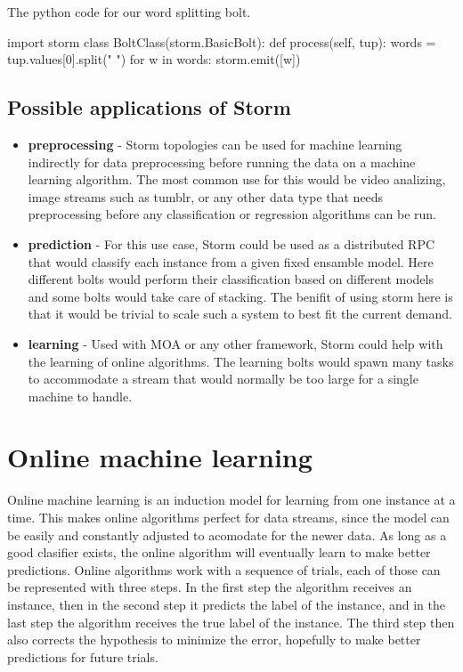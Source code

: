 \documentclass[journal]{IEEEtran/IEEEtran}
\begin{document}
The python code for our word splitting bolt.

\begin{code}

import storm
class BoltClass(storm.BasicBolt):
    def process(self, tup):
        words = tup.values[0].split(" ")
        for w in words:
            storm.emit([w])

\end{code}


\subsection{Possible applications of Storm}


\begin{itemize}
    \item \textbf{preprocessing} - Storm topologies can be used for machine learning indirectly for data preprocessing before running the data on a machine learning algorithm. The most common use for this would be video analizing, image streams such as tumblr, or any other data type that needs preprocessing before any classification or regression algorithms can be run.\\

    \item \textbf{prediction} - For this use case, Storm could be used as a distributed RPC that would classify each instance from a given fixed ensamble model. Here different bolts would perform their classification based on different models and some bolts would take care of stacking. The benifit of using storm here is that it would be trivial to scale such a system to best fit the current demand. 
\\
    \item \textbf{learning} - Used with MOA or any other framework, Storm could help with the learning of online algorithms. The learning bolts would spawn many tasks to accommodate a stream that would normally be too large for a single machine to handle.\\
\end{itemize}


\section{Online machine learning}

Online machine learning is an induction model for learning from one instance at a time. This makes online algorithms perfect for data streams, since the model can be easily and constantly adjusted to acomodate for the newer data. As long as a good clasifier exists, the online algorithm will eventually learn to make better predictions. Online algorithms work with a sequence of trials, each of those can be represented with three steps. In the first step the algorithm receives an instance, then in the second step it predicts the label of the instance, and in the last step the algorithm receives the true label of the instance. The third step then also corrects the hypothesis to minimize the error, hopefully to make better predictions for future trials. \\
\end{document}
